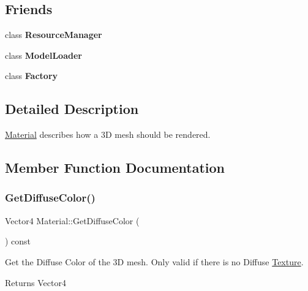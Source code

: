 \subsection*{Friends}
\begin{DoxyCompactItemize}
\item 
\mbox{\label{classMaterial_a54c1252abc87a78a301e6b6984470408}} 
class {\bfseries Resource\+Manager}
\item 
\mbox{\label{classMaterial_ac22dade55c1e8f81ea3e0892cd321190}} 
class {\bfseries Model\+Loader}
\item 
\mbox{\label{classMaterial_a328c093d609680cca505905c6d49901a}} 
class {\bfseries Factory}
\end{DoxyCompactItemize}


\subsection{Detailed Description}
\hyperlink{classMaterial}{Material} describes how a 3D mesh should be rendered. 

\subsection{Member Function Documentation}
\mbox{\label{classMaterial_af34f2b2d5ef3ee26f81dd9fc7e90162f}} 
\subsubsection{\texorpdfstring{Get\+Diffuse\+Color()}{GetDiffuseColor()}}
{\footnotesize\ttfamily Vector4 Material\+::\+Get\+Diffuse\+Color (\begin{DoxyParamCaption}{ }\end{DoxyParamCaption}) const}



Get the Diffuse Color of the 3D mesh. Only valid if there is no Diffuse \hyperlink{classTexture}{Texture}. 

\begin{DoxyReturn}{Returns}
Vector4 
\end{DoxyReturn}
\mbox{\label{classMaterial_a1b9db07af0385115afb5d16056a93f88}} 
